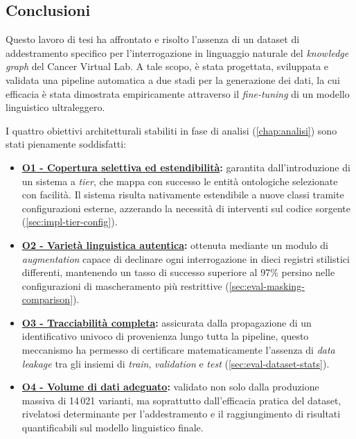 \documentclass[12pt,a4paper,openright,twoside]{book}
\begin{document}
\subsection{Conclusioni}

Questo lavoro di tesi ha affrontato e risolto l'assenza di un dataset di
addestramento specifico per l'interrogazione in linguaggio naturale del
\textit{knowledge graph} del Cancer Virtual Lab. A tale scopo, è stata
progettata, sviluppata e validata una pipeline automatica a due stadi per la
generazione dei dati, la cui efficacia è stata dimostrata empiricamente
attraverso il \textit{fine-tuning} di un modello linguistico ultraleggero.

I quattro obiettivi architetturali stabiliti in fase di analisi
(\cref{chap:analisi}) sono stati pienamente soddisfatti:

\begin{itemize}
    \item \textbf{\hyperref[obj:O1]{O1 - Copertura selettiva ed estendibilità}:}
          garantita dall'introduzione di un sistema a \textit{tier}, che mappa
          con successo le entità ontologiche selezionate con facilità. Il
          sistema risulta nativamente estendibile a nuove classi tramite
          configurazioni esterne, azzerando la necessità di interventi sul
          codice sorgente (\cref{sec:impl-tier-config}).
    \item \textbf{\hyperref[obj:O2]{O2 - Varietà linguistica autentica}:}
          ottenuta mediante un modulo di \textit{augmentation} capace di
          declinare ogni interrogazione in dieci registri stilistici differenti,
          mantenendo un tasso di successo superiore al 97\% persino nelle
          configurazioni di mascheramento più restrittive
          (\cref{sec:eval-masking-comparison}).
    \item \textbf{\hyperref[obj:O3]{O3 - Tracciabilità completa}:} assicurata
          dalla propagazione di un identificativo univoco di provenienza lungo tutta
          la pipeline, questo meccanismo ha permesso di certificare matematicamente
          l'assenza di \textit{data leakage} tra gli insiemi di \textit{train},
          \textit{validation} e \textit{test} (\cref{sec:eval-dataset-stats}).
    \item \textbf{\hyperref[obj:O4]{O4 - Volume di dati adeguato}:} validato non
          solo dalla produzione massiva di 14\,021 varianti, ma soprattutto
          dall'efficacia pratica del dataset, rivelatosi determinante per
          l'addestramento e il raggiungimento di risultati quantificabili sul modello
          linguistico finale.
\end{itemize}
\end{document}
